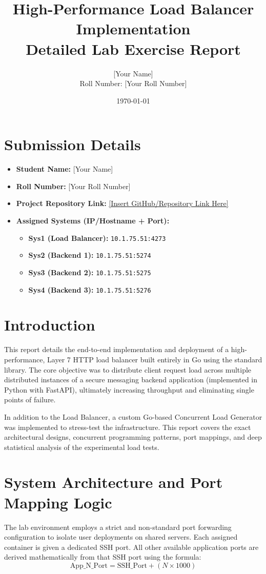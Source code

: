 \documentclass[12pt,a4paper]{article}
\title{High-Performance Load Balancer Implementation \\ \large Detailed Lab Exercise Report}
\author{[Your Name] \\ Roll Number: [Your Roll Number]}
\date{\today}
\begin{document}
\maketitle

\section*{Submission Details}
\begin{itemize}
    \item \textbf{Student Name:} [Your Name]
    \item \textbf{Roll Number:} [Your Roll Number]
    \item \textbf{Project Repository Link:} \url{[Insert GitHub/Repository Link Here]}
    \item \textbf{Assigned Systems (IP/Hostname + Port):}
    \begin{itemize}
        \item \textbf{Sys1 (Load Balancer):} \texttt{10.1.75.51:4273}
        \item \textbf{Sys2 (Backend 1):} \texttt{10.1.75.51:5274}
        \item \textbf{Sys3 (Backend 2):} \texttt{10.1.75.51:5275}
        \item \textbf{Sys4 (Backend 3):} \texttt{10.1.75.51:5276}
    \end{itemize}
\end{itemize}

\section{Introduction}
This report details the end-to-end implementation and deployment of a high-performance, Layer 7 HTTP load balancer built entirely in Go using the standard library. The core objective was to distribute client request load across multiple distributed instances of a secure messaging backend application (implemented in Python with FastAPI), ultimately increasing throughput and eliminating single points of failure.

In addition to the Load Balancer, a custom Go-based Concurrent Load Generator was implemented to stress-test the infrastructure. This report covers the exact architectural designs, concurrent programming patterns, port mappings, and deep statistical analysis of the experimental load tests.

\section{System Architecture and Port Mapping Logic}
The lab environment employs a strict and non-standard port forwarding configuration to isolate user deployments on shared servers. Each assigned container is given a dedicated SSH port. All other available application ports are derived mathematically from that SSH port using the formula:
\[ \text{App\_N\_Port} = \text{SSH\_Port} + (N \times 1000) \]
\end{document}
